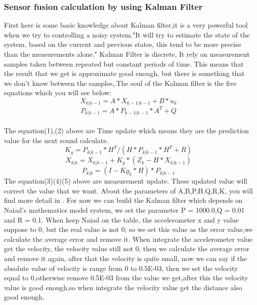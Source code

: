		\subsubsection*{Sensor fusion calculation by using Kalman Filter}
		\noindent
		First here is some basic knowledge about Kalman filter,it is a very powerful tool when we try to controlling a noisy system\cite{kalman_filter}."It will try to estimate the state of the system, based on the current and previous states, this tend to be more precise than the measurements alone."\cite{TKJ} Kalman Filter is discrete, It rely on measurement samples taken between repeated but constant periods of time. This means that the result that we get is approximate good enough, but there is something that we don't know between the samples\cite{Greg_Czerniaks_Website},\cite{change_parameter}.The soul of the Kalman filter is the five equations which you will see below:
\\
\begin{equation}
	X_{k|k-1} = A*X_{k-1|k-1} +B*u_{k}
\end{equation}
\begin{equation}
	P_{k|k-1} = A*P_{k-1|k-1}*A^{T} + Q
\end{equation}
\\The equation(1),(2) above are Time update which means they are the prediction value for the next round calculate.
\begin{equation}
K_{g} = P_{k|k-1}*H^{T}/(H*P_{k|k-1}*H^{T}+R)
\end{equation}
\begin{equation}
	X_{k|k} = X_{k|k-1} +K_{g}*(Z_{k}-H*X_{k|k-1})
\end{equation}
\begin{equation}
P_{k|k}=(I-Kg_{k}* H)*P_{k|k-1}
\end{equation}
 The equation(3)(4)(5) above are measurement update. These updated value will correct the value that we want\cite{kalman_filter_dummies}. About the parameters of A,B,P,H,Q,R,K, you will find more detail in \cite{parameter}.
 For now we can build the Kalman filter which depends on Naiad's mathematics model system, we set the parameter P = 1000.0,Q = 0.01 and R = 0.1. When keep Naiad on the table, the accelerometer x and y value suppose to 0, but the real value is not 0, so we set this value as the error value,we calculate the average error and remove it. When integrate the accelerometer value get the velocity, the velocity value still not 0, then we calculate the average error and remove it again, after that the velocity is quite small, now we can say if the absolute value of velocity is range from 0 to 0.5E-03, then we set the velocity equal to 0,otherwise remove 0.5E-03 from the value we get,after this the velocity value is good enough,so when integrate the velocity value get the distance also good enough.
 
